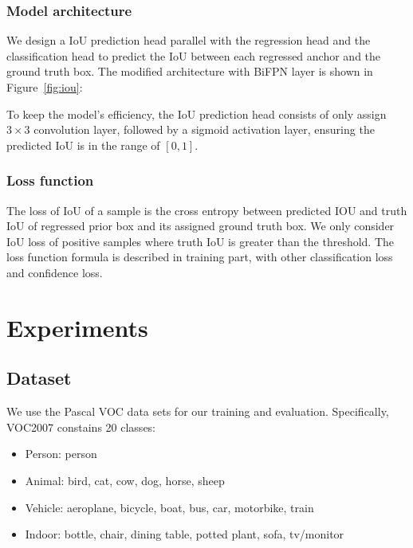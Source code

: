 \documentclass[journal,conference]{IEEEtran}
\begin{document}
\subsubsection{Model architecture}
We design a IoU prediction head parallel with the regression head and the classification head to predict the IoU between each regressed anchor and the ground truth box. The modified architecture with BiFPN layer is shown in Figure~\ref{fig:iou}:

To keep the model's efficiency, the IoU prediction head consists of only assign $3\times 3$ convolution layer, followed by a sigmoid activation layer, ensuring the predicted IoU is in the range of $[0, 1]$.

\subsubsection{Loss function}
The loss of IoU of a sample is the cross entropy between predicted IOU and truth IoU of regressed prior box and its assigned ground truth box. We only consider IoU loss of positive samples where truth IoU is greater than the threshold. The loss function formula is described in training part, with other classification loss and confidence loss.


\section{Experiments}

\subsection{Dataset}
We use the Pascal VOC data sets \cite{voc} for our training and evaluation. Specifically, VOC2007 constains 20 classes:
\begin{itemize}
  \item Person: person
  \item Animal: bird, cat, cow, dog, horse, sheep
  \item Vehicle: aeroplane, bicycle, boat, bus, car, motorbike, train
  \item Indoor: bottle, chair, dining table, potted plant, sofa, tv/monitor
\end{itemize}
\end{document}
